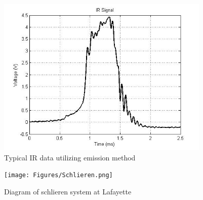 \begin{figure}
\centering
\includegraphics[height = 3in]{Figures/Co2NoPressure.jpg}
\caption[Typical IR data utilizing emission method]{Typical IR data utilizing emission method}
\label{fig:IRemission}
\end{figure}

\begin{figure}
\centering
\texttt{[image: Figures/Schlieren.png]}
\caption[Schlieren Diagram]{Diagram of schlieren system at Lafayette}
\label{fig:schlieren}
\end{figure}